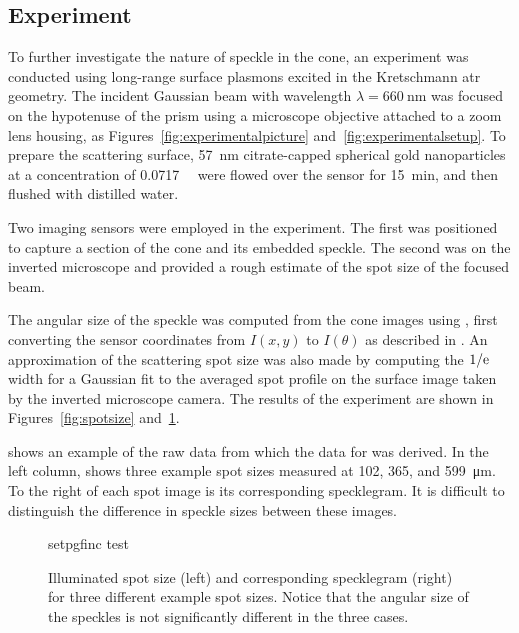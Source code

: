 \subsection{Experiment}\label{sec:specklesizeexpf}
To further investigate the nature of speckle in the cone, an experiment was
conducted using long-range surface plasmons excited in the Kretschmann \gls{atr}
geometry.  The incident Gaussian beam with wavelength $\lambda =
  \SI{660}{\nano\meter}$ was focused on the hypotenuse of the prism using a
microscope objective attached to a zoom lens housing, as
Figures~\ref{fig:experimentalpicture} and~\ref{fig:experimentalsetup}.  To
prepare the scattering surface, \SI{57}{\nano\meter} citrate-capped spherical
gold nanoparticles at a concentration of \SI{0.0717}{\nano\Molar} were flowed
over the sensor for \SI{15}{\minute}, and then flushed with distilled
water.

Two imaging sensors were employed in the experiment.  The first was positioned
to capture a section of the cone and its embedded speckle.  The second was on
the inverted microscope and provided a rough estimate of the spot size of the
focused beam.

The angular size of the speckle was computed from the cone images using
, first converting the sensor coordinates from $I(x,y)$
to $I(\theta)$ as described in .  An approximation of the
scattering spot size was also made by computing the $1/{\mathrm{e}}$ width for a
Gaussian fit to the averaged spot profile on the surface image taken by the
inverted microscope camera.  The results of the experiment are shown in
Figures~\ref{fig:spotsize} and~\ref{fig:spotsizewspeckle}.

 shows an example of the raw data from which the
data for  was derived.  In the left column,
 shows three example spot sizes measured at 102,
365, and \SI{599}{\micro\meter}.  To the right of each spot image is its
corresponding specklegram.  It is difficult to distinguish the difference in
speckle sizes between these images.
\begin{figure}[ht]
  \centering
  {setpgfinc}
  {test}
  \caption{Illuminated spot size (left) and corresponding specklegram (right)
    for three different example spot sizes.  Notice that the angular size of the
    speckles is not significantly different in the three cases.}
  \label{fig:spotsizewspeckle}
\end{figure}

